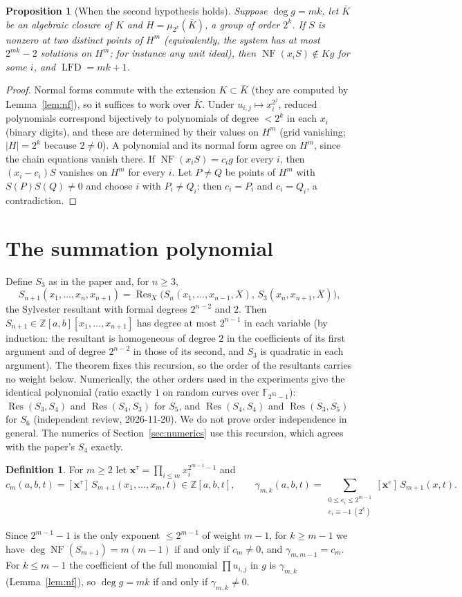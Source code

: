 \documentclass[11pt]{article}
\newcommand{\F}{\mathbb F}
\newcommand{\Z}{\mathbb Z}
\newcommand{\lfd}{\operatorname{LFD}}
\newcommand{\NF}{\operatorname{NF}}
\newcommand{\Res}{\operatorname{Res}}
\newtheorem{proposition}[theorem]{Proposition}
\theoremstyle{definition}
\newtheorem{definition}[theorem]{Definition}
\theoremstyle{remark}
\begin{document}
\begin{proposition}[When the second hypothesis holds]\label{prop:grid}
Suppose $\deg g=mk$, let $\bar K$ be an algebraic closure of $K$ and
$H=\mu_{2^k}(\bar K)$, a group of order $2^k$. If $S$ is nonzero at two
distinct points of $H^m$ (equivalently, the system has at most $2^{mk}-2$
solutions on $H^m$; for instance any unit ideal), then $\NF(x_iS)\notin Kg$
for some $i$, and $\lfd=mk+1$.
\end{proposition}
\begin{proof}
Normal forms commute with the extension $K\subset\bar K$ (they are
computed by Lemma~\ref{lem:nf}), so it suffices to work over $\bar K$.
Under $u_{i,j}\mapsto x_i^{2^j}$, reduced polynomials correspond bijectively to
polynomials of degree $<2^k$ in each $x_i$ (binary digits), and these are
determined by their values on $H^m$ (grid vanishing; $|H|=2^k$ because
$2\ne0$). A polynomial and its normal form agree on $H^m$, since the chain
equations vanish there. If $\NF(x_iS)=c_ig$ for every $i$, then
$(x_i-c_i)S$ vanishes on $H^m$ for every $i$. Let $P\ne Q$ be points of
$H^m$ with $S(P)S(Q)\ne0$ and choose $i$ with $P_i\ne Q_i$; then
$c_i=P_i$ and $c_i=Q_i$, a contradiction.
\end{proof}

\section{The summation polynomial}\label{sec:summation}
Define $S_3$ as in the paper and, for $n\ge3$,
\[
 S_{n+1}(x_1,\ldots,x_n,x_{n+1})=\Res_X\bigl(S_n(x_1,\ldots,x_{n-1},X),\,S_3(x_n,x_{n+1},X)\bigr),
\]
the Sylvester resultant with formal degrees $2^{n-2}$ and $2$. Then
$S_{n+1}\in\Z[a,b][x_1,\ldots,x_{n+1}]$ has degree at most $2^{n-1}$ in each
variable (by induction: the resultant is homogeneous of degree $2$ in the coefficients of
its first argument and of degree $2^{n-2}$ in those of its second, and $S_3$ is quadratic in each argument). The theorem fixes this recursion,
so the order of the resultants carries no weight below. Numerically, the
other orders used in the experiments give the identical polynomial (ratio
exactly $1$ on random curves over $\F_{2^{61}-1}$): $\Res(S_3,S_4)$ and
$\Res(S_4,S_3)$ for $S_5$, and $\Res(S_4,S_4)$ and $\Res(S_3,S_5)$ for $S_6$
(independent review, 2026-11-20). We do not prove order independence in
general. The numerics of Section~\ref{sec:numerics} use this recursion, which
agrees with the paper's $S_4$ exactly.

\begin{definition}
For $m\ge2$ let $\mathbf x^\tau=\prod_{i\le m}x_i^{2^{m-1}-1}$ and
\[
 c_m(a,b,t)=[\mathbf x^\tau]\,S_{m+1}(x_1,\ldots,x_m,t)\in\Z[a,b,t],
\qquad
 \gamma_{m,k}(a,b,t)=\sum_{\substack{0\le e_i\le2^{m-1}\\ e_i\equiv-1\ (2^k)}}[\mathbf x^e]\,S_{m+1}(x,t).
\]
\end{definition}
Since $2^{m-1}-1$ is the only exponent $\le2^{m-1}$ of weight $m-1$, for
$k\ge m-1$ we have $\deg\NF(S_{m+1})=m(m-1)$ if and only if $c_m\ne0$, and
$\gamma_{m,m-1}=c_m$. For $k\le m-1$ the coefficient of the full monomial
$\prod u_{i,j}$ in $g$ is $\gamma_{m,k}$ (Lemma~\ref{lem:nf}), so
$\deg g=mk$ if and only if $\gamma_{m,k}\ne0$.
\end{document}
